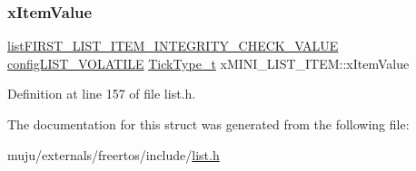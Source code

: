 \mbox{\label{structx_m_i_n_i___l_i_s_t___i_t_e_m_aae79c54ac1efa30959e68604cc23b29e}} 
\subsubsection{\texorpdfstring{x\+Item\+Value}{xItemValue}}
{\footnotesize\ttfamily \hyperlink{vendor_2ceedling_2plugins_2freertos_2vendor_2freertos_2include_2list_8h_a3611bd5d5d87cb26ac1dc7a4852b94a0}{list\+F\+I\+R\+S\+T\+\_\+\+L\+I\+S\+T\+\_\+\+I\+T\+E\+M\+\_\+\+I\+N\+T\+E\+G\+R\+I\+T\+Y\+\_\+\+C\+H\+E\+C\+K\+\_\+\+V\+A\+L\+UE} \hyperlink{vendor_2ceedling_2plugins_2freertos_2vendor_2freertos_2include_2list_8h_a2d5de557c5561c8980d1bf51d87d8cba}{config\+L\+I\+S\+T\+\_\+\+V\+O\+L\+A\+T\+I\+LE} \hyperlink{externals_2freertos_2portable_2_g_c_c_2_a_r_m___c_m0_2portmacro_8h_aa69c48c6e902ce54f70886e6573c92a9}{Tick\+Type\+\_\+t} x\+M\+I\+N\+I\+\_\+\+L\+I\+S\+T\+\_\+\+I\+T\+E\+M\+::x\+Item\+Value}



Definition at line 157 of file list.\+h.



The documentation for this struct was generated from the following file\+:\begin{DoxyCompactItemize}
\item 
muju/externals/freertos/include/\hyperlink{externals_2freertos_2include_2list_8h}{list.\+h}\end{DoxyCompactItemize}

